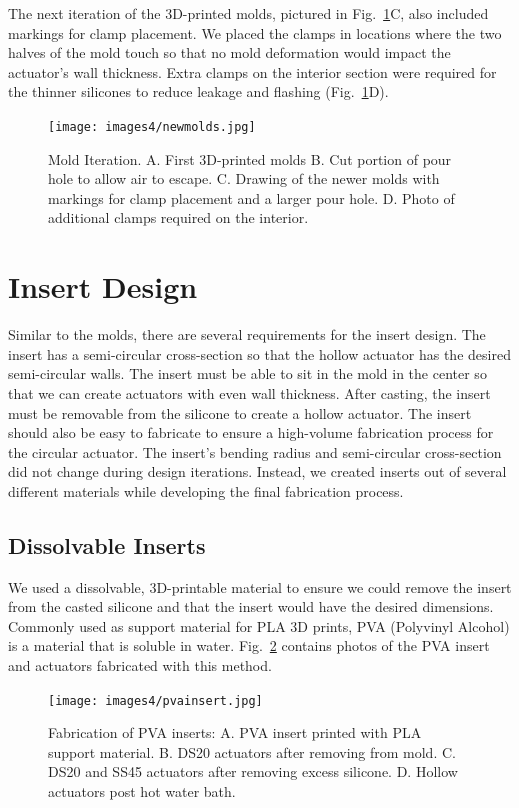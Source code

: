 The next iteration of the 3D-printed molds, pictured in Fig.~\ref{fig:newmolds}C, also included markings for clamp placement. We placed the clamps in locations where the two halves of the mold touch so that no mold deformation would impact the actuator's wall thickness. Extra clamps on the interior section were required for the thinner silicones to reduce leakage and flashing (Fig.~\ref{fig:newmolds}D). 

\begin{figure}[ht]
    \centering
    \texttt{[image: images4/newmolds.jpg]}
    \caption{Mold Iteration. A. First 3D-printed molds B. Cut portion of pour hole to allow air to escape. C. Drawing of the newer molds with markings for clamp placement and a larger pour hole. D. Photo of additional clamps required on the interior.}
    \label{fig:newmolds}
\end{figure}

\section{Insert Design}

Similar to the molds, there are several requirements for the insert design. The insert has a semi-circular cross-section so that the hollow actuator has the desired semi-circular walls. The insert must be able to sit in the mold in the center so that we can create actuators with even wall thickness. After casting, the insert must be removable from the silicone to create a hollow actuator. The insert should also be easy to fabricate to ensure a high-volume fabrication process for the circular actuator. The insert's bending radius and semi-circular cross-section did not change during design iterations. Instead, we created inserts out of several different materials while developing the final fabrication process. 

\subsection{Dissolvable Inserts}

We used a dissolvable, 3D-printable material to ensure we could remove the insert from the casted silicone and that the insert would have the desired dimensions. Commonly used as support material for PLA 3D prints, PVA (Polyvinyl Alcohol) is a material that is soluble in water. Fig.~\ref{fig:pvainsert} contains photos of the PVA insert and actuators fabricated with this method. 

\begin{figure}[!ht]
    \centering
    \texttt{[image: images4/pvainsert.jpg]}
    \caption{Fabrication of PVA inserts: A. PVA insert printed with PLA support material. B. DS20 actuators after removing from mold. C. DS20 and SS45 actuators after removing excess silicone. D. Hollow actuators post hot water bath.}
    \label{fig:pvainsert}
\end{figure}

